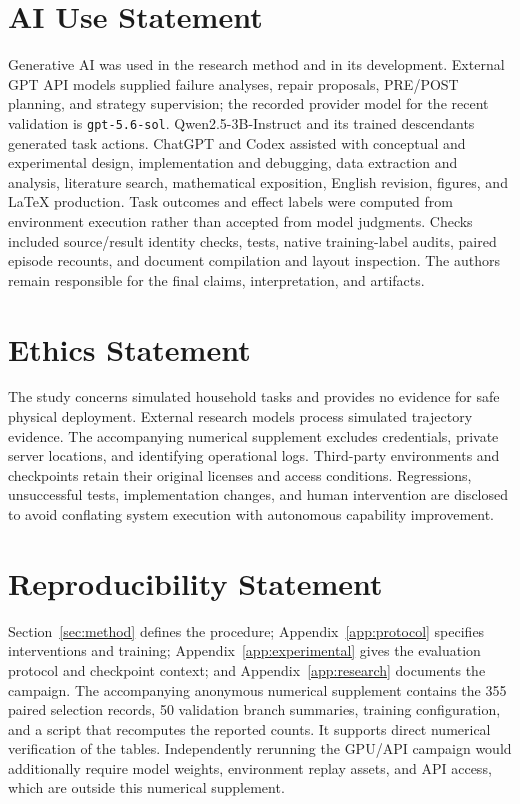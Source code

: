 \section*{AI Use Statement}
Generative AI was used in the research method and in its development.
External GPT API models supplied failure analyses, repair proposals,
PRE/POST planning, and strategy supervision; the recorded provider model
for the recent validation is \texttt{gpt-5.6-sol}. Qwen2.5-3B-Instruct and
its trained descendants generated task actions. ChatGPT and Codex assisted
with conceptual and experimental design, implementation and debugging,
data extraction and analysis, literature search, mathematical exposition,
English revision, figures, and LaTeX production. Task outcomes and effect
labels were computed from environment execution rather than accepted from
model judgments. Checks included source/result identity checks, tests,
native training-label audits, paired episode recounts, and document
compilation and layout inspection. The authors remain responsible for
the final claims, interpretation, and artifacts.

\section*{Ethics Statement}
The study concerns simulated household tasks and provides no evidence for
safe physical deployment. External research models process simulated
trajectory evidence. The accompanying numerical supplement excludes
credentials, private server locations, and identifying operational logs.
Third-party environments and checkpoints retain their original licenses
and access conditions. Regressions, unsuccessful tests, implementation
changes, and human intervention are disclosed to avoid conflating system
execution with autonomous capability improvement.

\section*{Reproducibility Statement}
Section~\ref{sec:method} defines the procedure;
Appendix~\ref{app:protocol} specifies interventions and training;
Appendix~\ref{app:experimental} gives the evaluation protocol and
checkpoint context; and Appendix~\ref{app:research} documents the campaign.
The accompanying anonymous numerical supplement contains the 355 paired
selection records, 50 validation branch summaries, training configuration,
and a script that recomputes the reported counts. It supports direct numerical
verification of the tables. Independently rerunning the GPU/API campaign
would additionally require model weights, environment replay assets, and
API access, which are outside this numerical supplement.
